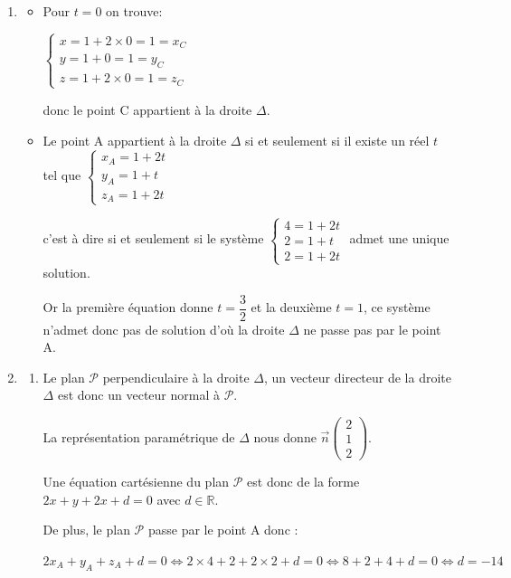 \documentclass[10pt]{article}
\providecommand{\R}{\mathbb{R}}
\providecommand{\vect}[1]{\overrightarrow{#1}}
\begin{document}
	\begin{enumerate}
		\item \begin{itemize} \item Pour $t=0$ on trouve: 

			$\begin{cases}  x= 1+2\times 0 =1 =x_C \\ y=1 +0 =1=y_C\\ z=1 +2\times 0 =1=z_C \end{cases}$ 

			donc le point C appartient à la droite $\Delta$. 

			\item Le point A appartient à la droite $\Delta$  si et seulement si il existe un réel $t$ tel que $\begin{cases} x_A=1+2t \\ y_A=1+t \\ z_A=1+2t \end{cases} $ 

c'est à dire si et seulement si le système  $\begin{cases} 4=1+2t \\ 2=1+t \\ 2=1+2t \end{cases}$ admet une unique solution.

Or la première équation donne $t=\dfrac{3}{2}$ et la deuxième $t=1$, ce système n'admet donc pas de solution d'où la droite $\Delta$ ne passe pas par le point A.
		\end{itemize} 
		\item
		\begin{enumerate}
			\item Le plan $\mathcal{P}$  perpendiculaire à la droite $\Delta$, un vecteur directeur de la droite $\Delta$ est donc un vecteur normal à $\mathcal{P}$. 
			
			La représentation paramétrique de $\Delta$ nous  donne $\vect{n}\begin{pmatrix} 2 \\1\\2 \end{pmatrix}$. 
			
			Une équation cartésienne du plan $\mathcal{P}$ est donc de la forme $2x+y+2x+d=0$ avec $d\in \R$. 
			
			De plus, le plan $\mathcal{P}$ passe  par le point A donc : 
			
			$2x_A+y_A+z_A+d=0 \Longleftrightarrow 2 \times 4 +2 +2 \times 2 +d=0 \Longleftrightarrow 8 +2 +4 +d=0 \Longleftrightarrow d=-14$


\end{enumerate}
\end{enumerate}
\end{document}
